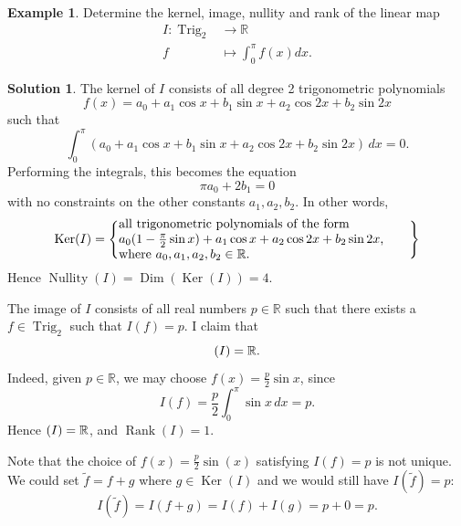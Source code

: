 \documentclass[a4paper,11pt]{book}
\theoremstyle{definition}
\newtheorem{example_environment}{Example}[chapter]
\newtheorem*{solution}{Solution}
\newenvironment{example}
	{
		\begin{oframed} 
		\begin{example_environment}
	}
	{
		\end{example_environment}
		\end{oframed}
	}
\DeclareMathOperator{\Trig}{Trig}
\DeclareMathOperator{\Dim}{Dim}
\DeclareMathOperator{\Ker}{Ker}
\DeclareMathOperator{\Nullity}{Nullity}
\DeclareMathOperator{\Rank}{Rank}
\let\Im\relax
\DeclareMathOperator{\Im}{Im} %
\begin{document}
\begin{example} Determine the kernel, image, nullity and rank of the linear map
\begin{align}
	I : \Trig_2 & \rightarrow \mathbb{R} \\
	 f & \mapsto \int_0^\pi f(x) dx .
\end{align}
\begin{solution} The kernel of $I$ consists of all degree 2 trigonometric polynomials
\[
 f(x) = a_0 + a_1 \cos x + b_1 \sin x + a_2 \cos 2x + b_2 \sin 2x
\]
such that
\[
 \int_0^\pi (a_0 + a_1 \cos x + b_1 \sin x + a_2 \cos 2x + b_2 \sin 2x) \, dx = 0. 
\] 
Performing the integrals, this becomes the equation
\[
 \pi a_0 + 2 b_1 = 0
\]
with no constraints on the other constants $a_1, a_2, b_2$. In other words, 
\[
\Ker(I) = \left\{ \mbox{\begin{minipage}{8cm} all trigonometric polynomials of the form  \\ $a_0(1 - \frac{\pi}{2} \sin x) + a_1 \cos x + a_2 \cos{2x} + b_2 \sin{2x}$, \\ where $a_0, a_1, a_2, b_2 \in \mathbb{R}$. \end{minipage}} \right\}
\]
Hence $\Nullity(I) = \Dim (\Ker(I)) = 4$. 

The image of $I$ consists of all real numbers $p \in \mathbb{R}$ such that there exists a $f \in \Trig_2$ such that $I(f) = p$. I claim that 
\[
 \Im(I) = \mathbb{R}.
\]
Indeed, given $p \in \mathbb{R}$, we may choose $f(x) = \frac{p}{2} \sin{x}$, since
\[
 I(f) = \frac{p}{2} \int_0^\pi \sin{x} \, dx  = p. 
\]
Hence $\Im(I) = \mathbb{R}$, and $\Rank(I) = 1$.

Note that the choice of $f(x) = \frac{p}{2} \sin(x)$ satisfying $I(f) = p$ is not unique. We could set $\tilde{f} = f + g$ where $g \in \Ker(I)$ and we would still have $I(\tilde{f})=p$:
\[
 I(\tilde{f}) = I(f + g) = I(f) + I(g) =  p + 0 = p.
\] 
\end{solution}
\end{example}
\end{document}

